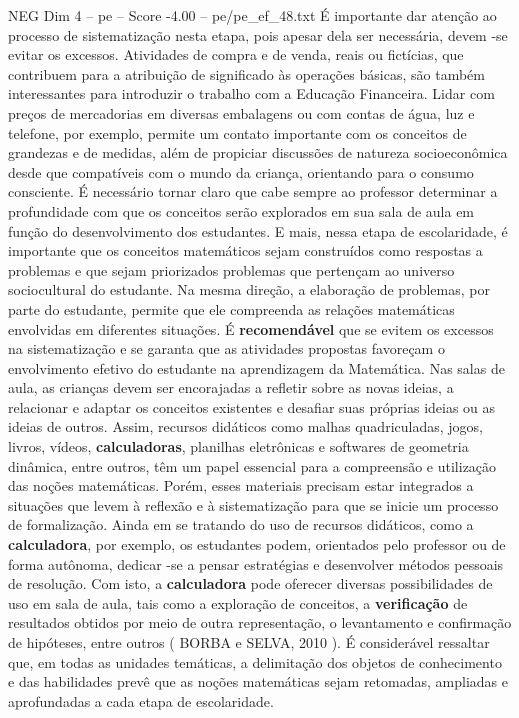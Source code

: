\begin{textsample}{NEG Dim 4 – pe – Score -4.00 – pe/pe\_ef\_48.txt}
É importante dar atenção ao processo de sistematização nesta etapa, pois apesar dela ser necessária, devem -se evitar os excessos.
Atividades de compra e de venda, reais ou fictícias, que contribuem para a atribuição de significado às operações básicas, são também interessantes para introduzir o trabalho com a Educação Financeira.
Lidar com preços de mercadorias em diversas embalagens ou com contas de água, luz e telefone, por exemplo, permite um contato importante com os conceitos de grandezas e de medidas, além de propiciar discussões de natureza socioeconômica desde que compatíveis com o mundo da criança, orientando para o consumo consciente.
É necessário tornar claro que cabe sempre ao professor determinar a profundidade com que os conceitos serão explorados em sua sala de aula em função do desenvolvimento dos estudantes.
E mais, nessa etapa de escolaridade, é importante que os conceitos matemáticos sejam construídos como respostas a problemas e que sejam priorizados problemas que pertençam ao universo sociocultural do estudante.
Na mesma direção, a elaboração de problemas, por parte do estudante, permite que ele compreenda as relações matemáticas envolvidas em diferentes situações.
É \textbf{recomendável} que se evitem os excessos na sistematização e se garanta que as atividades propostas favoreçam o envolvimento efetivo do estudante na aprendizagem da Matemática.
Nas salas de aula, as crianças devem ser encorajadas a refletir sobre as novas ideias, a relacionar e adaptar os conceitos existentes e desafiar suas próprias ideias ou as ideias de outros.
Assim, recursos didáticos como malhas quadriculadas, jogos, livros, vídeos, \textbf{calculadoras}, planilhas eletrônicas e softwares de geometria dinâmica, entre outros, têm um papel essencial para a compreensão e utilização das noções matemáticas.
Porém, esses materiais precisam estar integrados a situações que levem à reflexão e à sistematização para que se inicie um processo de formalização.
Ainda em se tratando do uso de recursos didáticos, como a \textbf{calculadora}, por exemplo, os estudantes podem, orientados pelo professor ou de forma autônoma, dedicar -se a pensar estratégias e desenvolver métodos pessoais de resolução.
Com isto, a \textbf{calculadora} pode oferecer diversas possibilidades de uso em sala de aula, tais como a exploração de conceitos, a \textbf{verificação} de resultados obtidos por meio de outra representação, o levantamento e confirmação de hipóteses, entre outros ( BORBA e SELVA, 2010 ).
É considerável ressaltar que, em todas as unidades temáticas, a delimitação dos objetos de conhecimento e das habilidades prevê que as noções matemáticas sejam retomadas, ampliadas e aprofundadas a cada etapa de escolaridade.

\end{textsample}
